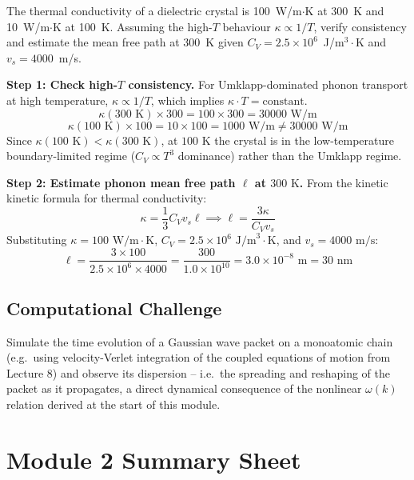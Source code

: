 \documentclass[11pt,a4paper]{article}
\begin{document}
\begin{probbox}[Problem 5]
The thermal conductivity of a dielectric crystal is 100~W/m$\cdot$K at 300~K and
10~W/m$\cdot$K at 100~K. Assuming the high-$T$ behaviour $\kappa\propto1/T$, verify
consistency and estimate the mean free path at 300~K given
$C_V=2.5\times10^6$~J/m$^3\cdot$K and $v_s=4000$~m/s.
\end{probbox}
\begin{solbox}
\textbf{Step 1: Check high-$T$ consistency.}
For Umklapp-dominated phonon transport at high temperature, $\kappa \propto 1/T$, which implies $\kappa \cdot T = \text{constant}$.
\[
\kappa(300\text{ K}) \times 300 = 100 \times 300 = 30000\text{ W/m}
\]
\[
\kappa(100\text{ K}) \times 100 = 10 \times 100 = 1000\text{ W/m} \neq 30000\text{ W/m}
\]
Since $\kappa(100\text{ K}) < \kappa(300\text{ K})$, at $100\text{ K}$ the crystal is in the low-temperature boundary-limited regime ($C_V \propto T^3$ dominance) rather than the Umklapp regime.

\textbf{Step 2: Estimate phonon mean free path $\ell$ at $300\text{ K}$.}
From the kinetic kinetic formula for thermal conductivity:
\[
\kappa = \frac{1}{3} C_V v_s \ell \implies \ell = \frac{3\kappa}{C_V v_s}
\]
Substituting $\kappa = 100\text{ W/m}\cdot\text{K}$, $C_V = 2.5 \times 10^6\text{ J/m}^3\cdot\text{K}$, and $v_s = 4000\text{ m/s}$:
\[
\ell = \frac{3 \times 100}{2.5 \times 10^6 \times 4000} = \frac{300}{1.0 \times 10^{10}} = 3.0 \times 10^{-8}\text{ m} = 30\text{ nm}
\]
\end{solbox}

\subsection*{Computational Challenge}

Simulate the time evolution of a Gaussian wave packet on a monoatomic chain
(e.g.\ using velocity-Verlet integration of the coupled equations of motion from
Lecture 8) and observe its dispersion -- i.e.\ the spreading and reshaping of the
packet as it propagates, a direct dynamical consequence of the nonlinear
$\omega(k)$ relation derived at the start of this module.

\newpage
\section*{Module 2 Summary Sheet}
\end{document}

